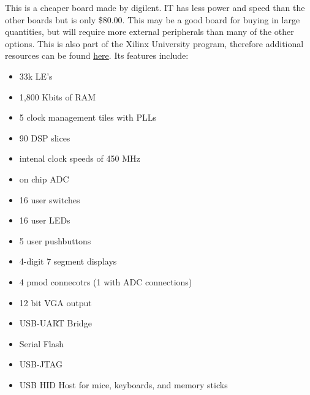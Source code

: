 \documentclass{article}
\begin{document}
	This is a cheaper board made by digilent. IT has less power and speed than the other boards but is only \$80.00. 
	This may be a good board for buying in large quantities, but will require more external peripherals than many of
	the other options. This is also part of the Xilinx University program, therefore additional resources can be
	found \href{https://www.digilentinc.com/Products/Detail.cfm?NavPath=2,400,1288&Prod=BASYS3}{here}. Its features
	include:

	\begin{itemize}
	\item 33k LE's
	\item 1,800 Kbits of RAM
	\item 5 clock management tiles with PLLs
	\item 90 DSP slices
	\item intenal clock speeds of 450 MHz
	\item on chip ADC
	\item 16 user switches
	\item 16 user LEDs
	\item 5 user pushbuttons
	\item 4-digit 7 segment displays
	\item 4 pmod connecotrs (1 with ADC connections)
	\item 12 bit VGA output
	\item USB-UART Bridge
	\item Serial Flash
	\item USB-JTAG
	\item USB HID Host for mice, keyboards, and memory sticks
	\end{itemize}
\end{document}
